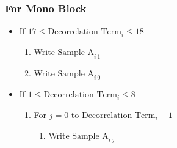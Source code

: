 \subsubsection{For Mono Block}
\begin{itemize}
\item If $17 \leq \text{Decorrelation Term}_i \leq 18$
\begin{enumerate}
\item Write $\text{Sample A}_{i~1}$
\item Write $\text{Sample A}_{i~0}$
\end{enumerate}
\item If $1 \leq \text{Decorrelation Term}_i \leq 8$
\begin{enumerate}
\item For $j = 0$ to $\text{Decorrelation Term}_i - 1$
\begin{enumerate}
\item Write $\text{Sample A}_{i~j}$
\end{enumerate}
\end{enumerate}
\end{itemize}

